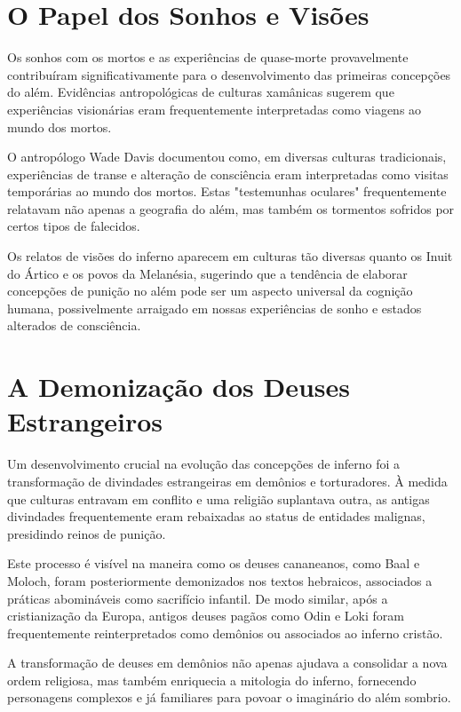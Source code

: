 \section{O Papel dos Sonhos e Visões}

Os sonhos com os mortos e as experiências de quase-morte provavelmente contribuíram significativamente para o desenvolvimento das primeiras concepções do além. Evidências antropológicas de culturas xamânicas sugerem que experiências visionárias eram frequentemente interpretadas como viagens ao mundo dos mortos.

O antropólogo Wade Davis documentou como, em diversas culturas tradicionais, experiências de transe e alteração de consciência eram interpretadas como visitas temporárias ao mundo dos mortos. Estas "testemunhas oculares" frequentemente relatavam não apenas a geografia do além, mas também os tormentos sofridos por certos tipos de falecidos.

Os relatos de visões do inferno aparecem em culturas tão diversas quanto os Inuit do Ártico e os povos da Melanésia, sugerindo que a tendência de elaborar concepções de punição no além pode ser um aspecto universal da cognição humana, possivelmente arraigado em nossas experiências de sonho e estados alterados de consciência.

\section{A Demonização dos Deuses Estrangeiros}

Um desenvolvimento crucial na evolução das concepções de inferno foi a transformação de divindades estrangeiras em demônios e torturadores. À medida que culturas entravam em conflito e uma religião suplantava outra, as antigas divindades frequentemente eram rebaixadas ao status de entidades malignas, presidindo reinos de punição.

Este processo é visível na maneira como os deuses cananeanos, como Baal e Moloch, foram posteriormente demonizados nos textos hebraicos, associados a práticas abomináveis como sacrifício infantil. De modo similar, após a cristianização da Europa, antigos deuses pagãos como Odin e Loki foram frequentemente reinterpretados como demônios ou associados ao inferno cristão.

A transformação de deuses em demônios não apenas ajudava a consolidar a nova ordem religiosa, mas também enriquecia a mitologia do inferno, fornecendo personagens complexos e já familiares para povoar o imaginário do além sombrio.


